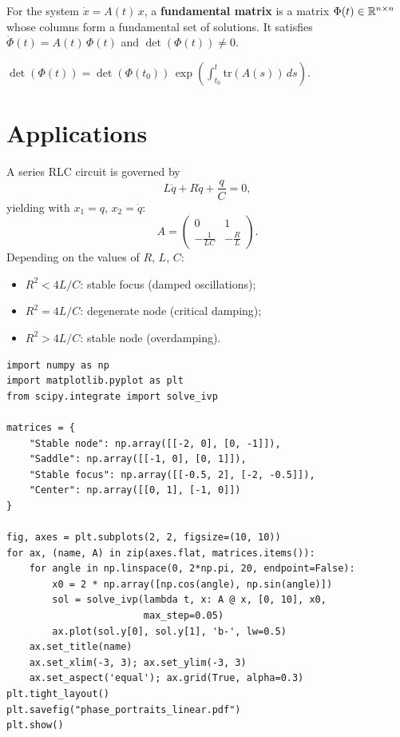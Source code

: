 \begin{definition}
For the system $\dot{x} = A(t)\, x$, a \textbf{fundamental matrix} is a
matrix $\Phi(t) \in \mathbb{R}^{n \times n}$ whose columns form a fundamental set
of solutions. It satisfies $\dot{\Phi}(t) = A(t)\, \Phi(t)$ and
$\det(\Phi(t)) \neq 0$.
\end{definition}

\begin{theorem}
$\det(\Phi(t)) = \det(\Phi(t_0))\, \exp\!\left(\int_{t_0}^t \mathrm{tr}(A(s))\, ds\right)$.
\end{theorem}

\section{Applications}

\begin{example}
A series RLC circuit is governed by
\[
    L\ddot{q} + R\dot{q} + \frac{q}{C} = 0,
\]
yielding with $x_1 = q$, $x_2 = \dot{q}$:
\[
    A = \begin{pmatrix} 0 & 1 \\ -\frac{1}{LC} & -\frac{R}{L} \end{pmatrix}.
\]
Depending on the values of $R$, $L$, $C$:
\begin{itemize}
    \item $R^2 < 4L/C$: stable focus (damped oscillations);
    \item $R^2 = 4L/C$: degenerate node (critical damping);
    \item $R^2 > 4L/C$: stable node (overdamping).
\end{itemize}
\end{example}

\begin{codeblock}[title=\textbf{Phase portraits for different matrices}]
\begin{verbatim}
import numpy as np
import matplotlib.pyplot as plt
from scipy.integrate import solve_ivp

matrices = {
    "Stable node": np.array([[-2, 0], [0, -1]]),
    "Saddle": np.array([[-1, 0], [0, 1]]),
    "Stable focus": np.array([[-0.5, 2], [-2, -0.5]]),
    "Center": np.array([[0, 1], [-1, 0]])
}

fig, axes = plt.subplots(2, 2, figsize=(10, 10))
for ax, (name, A) in zip(axes.flat, matrices.items()):
    for angle in np.linspace(0, 2*np.pi, 20, endpoint=False):
        x0 = 2 * np.array([np.cos(angle), np.sin(angle)])
        sol = solve_ivp(lambda t, x: A @ x, [0, 10], x0,
                        max_step=0.05)
        ax.plot(sol.y[0], sol.y[1], 'b-', lw=0.5)
    ax.set_title(name)
    ax.set_xlim(-3, 3); ax.set_ylim(-3, 3)
    ax.set_aspect('equal'); ax.grid(True, alpha=0.3)
plt.tight_layout()
plt.savefig("phase_portraits_linear.pdf")
plt.show()
\end{verbatim}
\end{codeblock}

